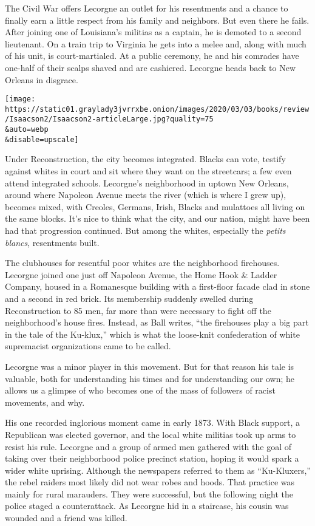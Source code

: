 The Civil War offers Lecorgne an outlet for his resentments and a chance
to finally earn a little respect from his family and neighbors. But even
there he fails. After joining one of Louisiana's militias as a captain,
he is demoted to a second lieutenant. On a train trip to Virginia he
gets into a melee and, along with much of his unit, is court-martialed.
At a public ceremony, he and his comrades have one-half of their scalps
shaved and are cashiered. Lecorgne heads back to New Orleans in
disgrace.

\texttt{[image: https://static01.graylady3jvrrxbe.onion/images/2020/03/03/books/review/Isaacson2/Isaacson2-articleLarge.jpg?quality=75\\\&auto=webp\\\&disable=upscale]}

Under Reconstruction, the city becomes integrated. Blacks can vote,
testify against whites in court and sit where they want on the
streetcars; a few even attend integrated schools. Lecorgne's
neighborhood in uptown New Orleans, around where Napoleon Avenue meets
the river (which is where I grew up), becomes mixed, with Creoles,
Germans, Irish, Blacks and mulattoes all living on the same blocks. It's
nice to think what the city, and our nation, might have been had that
progression continued. But among the whites, especially the \emph{petits
blancs}, resentments built.

The clubhouses for resentful poor whites are the neighborhood
firehouses. Lecorgne joined one just off Napoleon Avenue, the Home Hook
\& Ladder Company, housed in a Romanesque building with a first-floor
facade clad in stone and a second in red brick. Its membership suddenly
swelled during Reconstruction to 85 men, far more than were necessary to
fight off the neighborhood's house fires. Instead, as Ball writes, ``the
firehouses play a big part in the tale of the Ku-klux,'' which is what
the loose-knit confederation of white supremacist organizations came to
be called.

Lecorgne was a minor player in this movement. But for that reason his
tale is valuable, both for understanding his times and for understanding
our own; he allows us a glimpse of who becomes one of the mass of
followers of racist movements, and why.

His one recorded inglorious moment came in early 1873. With Black
support, a Republican was elected governor, and the local white militias
took up arms to resist his rule. Lecorgne and a group of armed men
gathered with the goal of taking over their neighborhood police precinct
station, hoping it would spark a wider white uprising. Although the
newspapers referred to them as ``Ku-Kluxers,'' the rebel raiders most
likely did not wear robes and hoods. That practice was mainly for rural
marauders. They were successful, but the following night the police
staged a counterattack. As Lecorgne hid in a staircase, his cousin was
wounded and a friend was killed.

